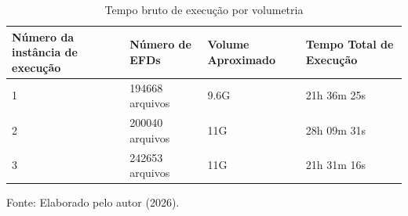 \begin{table}[hbt!]
    \centering
    \caption{Tempo bruto de execução por volumetria}
    \label{tab:tempo_execucao}
    \begin{tabular}{p{2cm} p{3cm} p{2cm} p{4cm}}
        \toprule
        \textbf{Número da instância de execução} & \textbf{Número de EFDs} & \textbf{Volume Aproximado} & \textbf{Tempo Total de Execução} \\
        \midrule
        1 & 194668 arquivos & 9.6G & 21h 36m 25s \\
        2 & 200040 arquivos & 11G  & 28h 09m 31s \\
        3 & 242653 arquivos & 11G  & 21h 31m 16s \\
        \bottomrule
    \end{tabular}

    \vspace{0.2cm}
    \small{Fonte: Elaborado pelo autor (2026).}
\end{table}
